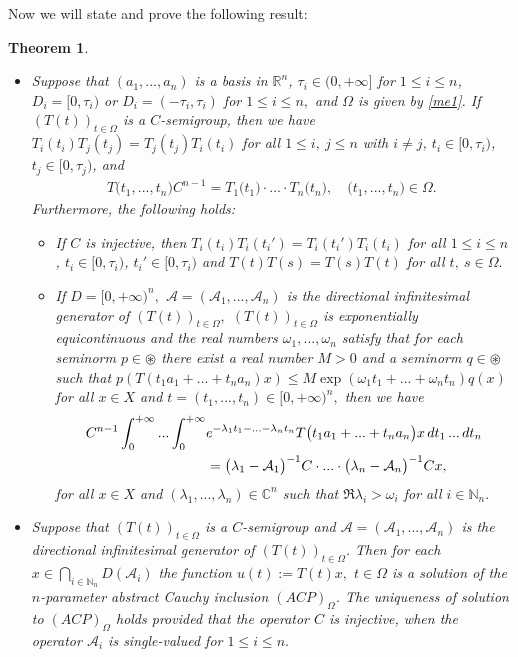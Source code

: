 \documentclass{amsart}
\newtheorem{thm}{Theorem}[section]
\theoremstyle{definition}
\theoremstyle{remark}
\numberwithin{equation}{section}
\begin{document}
Now we will state and prove the following result:

\begin{thm}\label{tucko1}
\begin{itemize}
\item[(i)] Suppose that $(a_{1},...,a_{n})$ is a basis in ${\mathbb R}^{n}$, $\tau_{i}\in (0,+\infty]$ for $1\leq i \leq n$, $D_{i}=[0,\tau_{i})$ or $D_{i}=(-\tau_{i},\tau_{i})$ for $1\leq i\leq n,$ 
and $\Omega$ is given by \eqref{me1}. If $(T(t))_{t\in \Omega} $ 
is a $C$-semigroup, then we have $T_{i}(t_{i})T_{j}(t_{j})=T_{j}(t_{j})T_{i}(t_{i})$ for all $1\leq i,\ j\leq n$ with $i\neq j$, $t_{i}\in [0,\tau_{i})$, $t_{j}\in [0,\tau_{j})$, and
\begin{align}\label{345}
T\bigl(t_{1},...,t_{n}\bigr)C^{n-1}=T_{1}\bigl(t_{1}\bigr) \cdot ... \cdot T_{n}\bigl(t_{n}\bigr),\quad \bigl(t_{1},...,t_{n}\bigr) \in \Omega.
\end{align}
Furthermore, the following holds:
\begin{itemize}
\item[(a)] If $C$ is injective, then $T_{i}(t_{i})T_{i}(t_{i}')=T_{i}(t_{i}')T_{i}(t_{i})$ for all $1\leq i\leq n$, $t_{i}\in [0,\tau_{i})$, $t_{i}'\in [0,\tau_{i})$ and $T(t)T(s)=T(s)T(t)$ for all $t,\ s\in \Omega.$
\item[(b)]
If $D=[0,+\infty)^{n},$ ${\mathcal A}=({\mathcal A}_{1},...,{\mathcal A}_{n})$ is the directional infinitesimal generator of $(T(t))_{t\in \Omega},$ $(T(t))_{t\in \Omega}$ is exponentially equicontinuous and the real numbers $\omega_{1},..., \omega_{n}$ satisfy that for each seminorm $p\in \circledast$ there exist a real number $M>0$ and a seminorm $q\in \circledast$ such that $p(T(t_{1}a_{1}+...+t_{n}a_{n})x)\leq M\exp(\omega_{1}t_{1}+...+\omega_{n}t_{n})q(x)$ for all $x\in X$ and $t=(t_{1},...,t_{n})\in [0,+\infty)^{n},$ then we have
\begin{align}\notag
C^{n-1} \int^{+\infty}_{0}...\int^{+\infty}_{0}& e^{-\lambda_{1}t_{1}-...-\lambda_{n}t_{n}}T\bigl(t_{1}a_{1}+...+t_{n}a_{n}\bigr)x\, dt_{1}\, ...\, dt_{n}
\\&  \label{345621}=\bigl( \lambda_{1}-{\mathcal A}_{1}\bigr)^{-1}C\cdot ... \cdot \bigl( \lambda_{n}-{\mathcal A}_{n}\bigr)^{-1}Cx,
\end{align}
for all $x\in X$ and $(\lambda_{1},...,\lambda_{n})\in {\mathbb C}^{n}$ such that $\Re \lambda_{i}>\omega_{i}$ for all $i\in {\mathbb N}_{n}.$
\end{itemize}
\item[(ii)] Suppose that 
$(T(t))_{t\in \Omega} $ 
is a $C$-semigroup and ${\mathcal A}=({\mathcal A}_{1},...,{\mathcal A}_{n})$ is the directional infinitesimal generator of $(T(t))_{t\in \Omega}$. Then for each $ x\in \bigcap_{i\in {\mathbb N}_{n}}D( {\mathcal A} _{i})$ the function $u(t):=T(t)x,$ $t\in \Omega $ is a   solution of the $n$-parameter abstract Cauchy inclusion $(ACP)_{\Omega}$.  The uniqueness of solution to $(ACP)_{\Omega}$ holds provided that the operator $C$ is injective, when the operator ${\mathcal A}_{i}$ is single-valued for $1\leq i \leq n.$
\end{itemize}
\end{thm}
\end{document}
